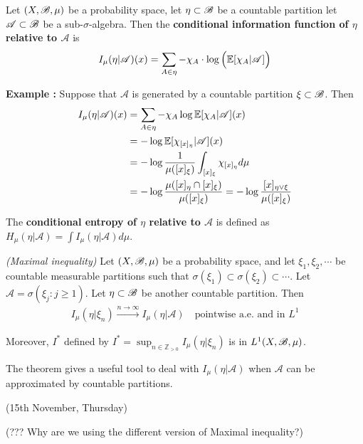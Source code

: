 \documentclass[12pt,a4paper]{report}
\begin{document}
Let $(X,\mathscr{B}, \mu)$ be a probability space, let $\eta \subset \mathscr{B}$ be a countable partition let $\mathscr{A} \subset \mathscr{B}$ be a sub-$\sigma$-algebra. Then the \textbf{conditional information function of $\eta$ relative to $\mathscr{A}$} is
\begin{align*}
I_{\mu}(\eta | \mathscr{A}) (x) = \sum_{A \in \eta} -\chi_A \cdot \log \Big( \mathbb{E}[\chi_A | \mathscr{A}] \Big)
\end{align*}
\s

\textbf{Example :} Suppose that $\mathscr{A}$ is generated by a countable partition $\xi \subset \mathscr{B}$. Then
\begin{align*}
I_{\mu}(\eta | \mathscr{A})(x) &= \sum_{A \in \eta} -\chi_A \log \mathbb{E} [\chi_A | \mathscr{A}](x) \\
&= -\log \mathbb{E}[ \chi_{[x]_{\eta}} | \mathscr{A}] (x)  \\
&= -\log \frac{1}{\mu([x]_{\xi})} \int_{[x]_{\xi}} \chi_{[x]_{\eta}} d\mu \\
&= -\log \frac{\mu([x]_{\eta} \cap [x]_{\xi} )}{\mu([x]_{\xi})} = -\log \frac{[x]_{\eta \vee \xi}}{\mu([x]_{\xi})}
\end{align*}
\s

 The \textbf{conditional entropy of $\eta$ relative to $\mathscr{A}$} is defined as $H_{\mu}(\eta | \mathscr{A}) = \int I_{\mu}(\eta | \mathscr{A}) d\mu$. 
\s

\thm \emph{(Maximal inequality)} Let $(X,\mathscr{B}, \mu)$ be a probability space, and let $\xi_1, \xi_2, \cdots$ be countable measurable partitions such that $\sigma(\xi_1) \subset \sigma(\xi_2) \subset \cdots$. Let $\mathscr{A} = \sigma(\xi_j:j\geq 1)$. Let $\eta \subset \mathscr{B}$ be another countable partition. Then 
\begin{align*}
I_{\mu}(\eta | \xi_n) \xrightarrow{n\rightarrow \infty} I_{\mu}(\eta | \mathscr{A}) \quad \text{pointwise a.e. and in } L^1
\end{align*}

\quad Moreover, $I^*$ defined by $I^* = \sup_{n\in \mathbb{Z}_{>0}} I_{\mu}(\eta | \xi_n)$ is in $L^1(X,\mathscr{B}, \mu)$.
\s

The theorem gives a useful tool to deal with $I_{\mu}(\eta | \mathscr{A})$ when $\mathscr{A}$ can be approximated by countable partitions. 
\s

\newday

(15th November, Thursday)
\s

(??? Why are we using the different version of Maximal inequality?)
\s
\end{document}
